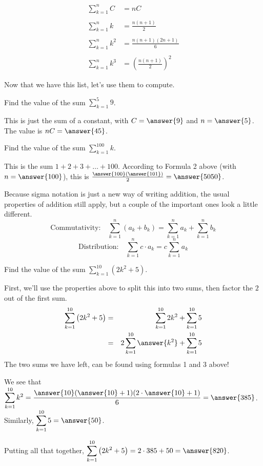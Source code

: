 \documentclass{ximera}
\begin{document}
 \begin{align*}
	\sum_{k=1}^n C &= nC \\ \\
	\sum_{k=1}^n k &= \frac{n(n+1)}{2} \\ \\
	\sum_{k=1}^n k^2 &= \frac{n(n+1)(2n+1)}{6} \\ \\
	\sum_{k=1}^n k^3 &= \left(\frac{n(n+1)}{2}\right)^2
\end{align*} 


Now that we have this list, let's use them to compute.
\begin{example}
	Find the value of the sum $\displaystyle \sum_{k=1}^{5} 9$.
	\begin{explanation}
		This is just the sum of a constant, with $C=\answer{9}$ and $n=\answer{5}$.  The value is $nC=\answer{45}$.	
	\end{explanation}
\end{example}

 

\begin{example}
	Find the value of the sum $\displaystyle \sum_{k=1}^{100} k$.
	\begin{explanation}
		This is the sum $1+2+3+ \ldots + 100$.  According to Formula 2 above (with $n=\answer{100}$), this is $\frac{\answer{100}(\answer{101})}{2} = \answer{5050}$.	
	\end{explanation}
\end{example}

 

 Because sigma notation is just a new way of writing addition, the usual properties of addition still apply, but a couple of the important ones look a little different.
\[ \text{Commutativity:} \quad \sum_{k=1}^{n} (a_k + b_k) = \sum_{k=1}^n a_k + \sum_{k=1}^n b_k \]
\[ \text{Distribution:}  \quad \sum_{k=1}^{n} c \cdot a_k = c \sum_{k=1}^n a_k \]


\begin{example}
	Find the value of the sum $\displaystyle \sum_{k=1}^{10} \left(2k^2+5\right)$.
	\begin{explanation}
		First, we'll use the properties above to split this into two sums, then factor the $2$ out of the first sum.
		\begin{eqnarray*}
			\sum_{k=1}^{10} \left(2k^2+5\right) &=& \sum_{k=1}^{10} 2k^2 + \sum_{k=1}^{10} 5\\
				&=& 2 \sum_{k=1}^{10} \answer{k^2} + \sum_{k=1}^{10} 5
		\end{eqnarray*}
		The two sums we have left, can be found using formulas 1 and 3 above!
		
		 We see that $\displaystyle \sum_{k=1}^{10} k^2 = \frac{\answer{10}(\answer{10}+1)(2\cdot \answer{10}+1)}{6} = \answer{385}$.  Similarly, $\displaystyle \sum_{k=1}^{10} 5 = \answer{50}$.
		
		 Putting all that together, $\displaystyle \sum_{k=1}^{10}\left(2k^2+5\right) = 2 \cdot 385 + 50 = \answer{820}$.
	\end{explanation}
\end{example}
 
\end{document}
